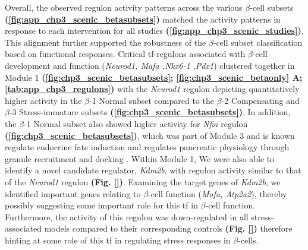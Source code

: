 
\par Overall, the observed regulon activity patterns across the various $\beta$-cell subsets \textbf{(\autoref{fig:app_chp3_scenic_betasubsets})} matched the activity patterns in response to each intervention for all studies \textbf{(\autoref{fig:app_chp3_scenic_studies})}. This alignment further supported the robustness of the $\beta$-cell subset classification based on functional responses. Critical \gls{tf}-regulons associated with $\beta$-cell development and function (\textit{Neurod1, Mafa ,Nkx6-1 ,Pdx1}) clustered together in Module 1 \textbf{(\autoref{fig:chp3_scenic_betasubsets}; \autoref{fig:chp3_scenic_betaonly} A; \autoref{tab:app_chp3_regulons})} with the \textit{Neurod1} regulon depicting quantitatively higher activity in the $\beta$-1 Normal subset compared to the $\beta$-2 Compensating and $\beta$-3 Stress-immature subsets \textbf{(\autoref{fig:chp3_scenic_betasubsets})}. In addition, the $\beta$-1 Normal subset also showed higher activity for \textit{Nfia} regulon \textbf{(\autoref{fig:chp3_scenic_betasubsets})}, which was part of Module 3 and is known regulate endocrine fate induction \textbf{\cite{scavuzzo_pancreatic_2018}} and regulates pancreatic physiology through granule recruitment and docking \textbf{\cite{scavuzzo_nfia_2019}}. Within Module 1, We were also able to identify a novel candidate regulator, \textit{Kdm2b}, with regulon activity similar to that of the \textit{Neurod1} regulon \textbf{(Fig. \ref{})}. Examining the target genes of \textit{Kdm2b}, we identified important genes relating to  $\beta$-cell function (\textit{Mafa, Atp2a2}), thereby possibly suggesting some important role for this \gls{tf} in $\beta$-cell function. Furthermore, the activity of this regulon was down-regulated in all stress-associated models compared to their corresponding controls \textbf{(Fig. \ref{})} therefore hinting at some role of this \gls{tf} in regulating stress responses in $\beta$-cells.\\ 

